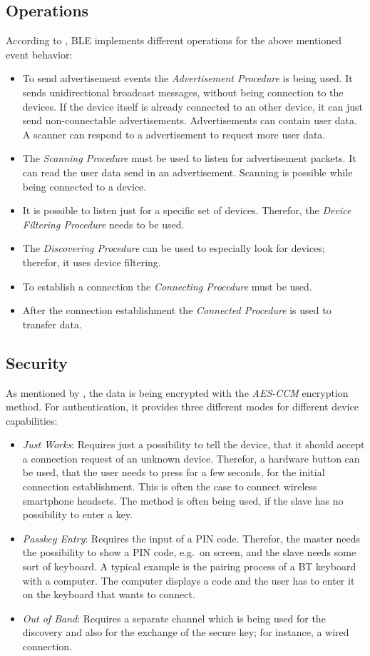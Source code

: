 \subsection*{Operations}
According to \citet{bluetooth:spec}, \ac{BLE} implements different operations for the above mentioned event behavior:
\begin{itemize}
  \item To send advertisement events the \emph{Advertisement Procedure} is being used. It sends unidirectional broadcast messages, without being connection to the devices. If the device itself is already connected to an other device, it can just send non-connectable advertisements. Advertisements can contain user data. A scanner can respond to a advertisement to request more user data.
  \item The \emph{Scanning Procedure} must be used to listen for advertisement packets. It can read the user data send in an advertisement. Scanning is possible while being connected to a device.
  \item It is possible to listen just for a specific set of devices. Therefor, the \emph{Device Filtering Procedure} needs to be used.
  \item The \emph{Discovering Procedure} can be used to especially look for devices; therefor, it  uses device filtering.
  \item To establish a connection the \emph{Connecting Procedure} must be used.
  \item After the connection establishment the \emph{Connected Procedure} is used to transfer data.
\end{itemize}

\subsection*{Security}
As mentioned by \citet{bluetooth:spec}, the data is being encrypted with the \emph{AES-CCM} encryption method. For authentication, it provides three different modes for different device capabilities:
\begin{itemize}
  \item \emph{Just Works}: Requires just a possibility to tell the device, that it should accept a connection request of an unknown device. Therefor, a hardware button can be used, that the user needs to press for a few seconds, for the initial connection establishment. This is often the case to connect wireless smartphone headsets. The method is often being used, if the slave has no possibility to enter a key.
  \item \emph{Passkey Entry}: Requires the input of a PIN code. Therefor, the master needs the possibility to show a PIN code, e.g.\ on screen, and the slave needs some sort of keyboard. A typical example is the pairing process of a \ac{BT} keyboard with a computer. The computer displays a code and the user has to enter it on the keyboard that wants to connect.
  \item \emph{Out of Band}: Requires a separate channel which is being used for the discovery and also for the exchange of the secure key; for instance, a wired connection.
\end{itemize}


